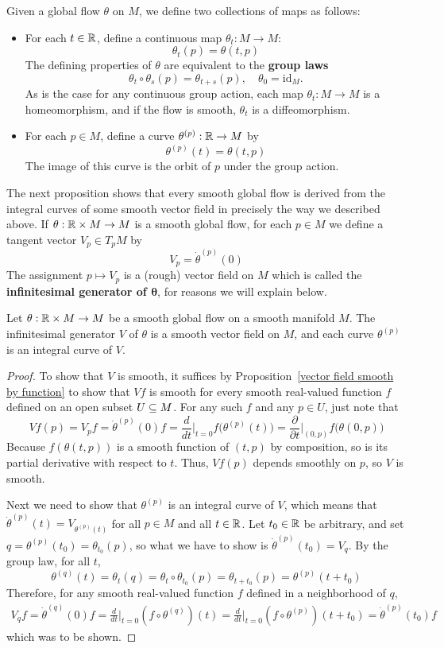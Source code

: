 Given a global flow $\theta$ on $M$, we define two collections of maps as follows:
\begin{itemize}
\item For each $t\in\mathbb{R}$, define a continuous map $\theta_t:M\to M$:
\[\theta_t(p)=\theta(t,p)\]
The defining properties of $\theta$ are equivalent to the \textbf{group laws}
\[\theta_t\circ\theta_s(p)=\theta_{t+s}(p),\quad\theta_0=\mathrm{id}_M.\]
As is the case for any continuous group action, each map $\theta_t:M\to M$ is a homeomorphism, and if the flow is smooth, $\theta_t$ is a diffeomorphism.
\item For each $p\in M$, define a curve $\theta^{(p)}:\mathbb{R}\to M$ by
\[\theta^{(p)}(t)=\theta(t,p)\]
The image of this curve is the orbit of $p$ under the group action.
\end{itemize}
The next proposition shows that every smooth global flow is derived from the
integral curves of some smooth vector field in precisely the way we described above. If $\theta:\mathbb{R}\times M\to M$ is a smooth global flow, for each $p\in M$ we define a tangent vector $V_p\in T_pM$ by
\[V_p=\dot{\theta}^{(p)}(0)\]
The assignment $p\mapsto V_p$ is a (rough) vector field on $M$ which is called the \textbf{infinitesimal generator of $\bm{\theta}$}, for reasons we will explain below.
\begin{proposition}\label{flow generate vector}
Let $\theta:\mathbb{R}\times M\to M$ be a smooth global flow on a smooth manifold $M$. The infinitesimal generator $V$ of $\theta$ is a smooth vector field on $M$, and each curve $\theta^{(p)}$ is an integral curve of $V$.
\end{proposition}
\begin{proof}
To show that $V$ is smooth, it suffices by Proposition~\ref{vector field smooth by function} to show that $Vf$ is smooth for every smooth real-valued function $f$ defined on an open subset $U\subseteq M$. For any such $f$ and any $p\in U$, just note that
\[Vf(p)=V_pf=\dot{\theta}^{(p)}(0)f=\frac{d}{dt}\Big|_{t=0}f\big(\theta^{(p)}(t)\big)=\frac{\partial}{\partial t}\Big|_{(0,p)}f\big(\theta(0,p)\big)\]
Because $f(\theta(t,p))$ is a smooth function of $(t,p)$ by composition, so is its partial derivative with respect to $t$. Thus, $Vf(p)$ depends smoothly on $p$, so $V$ is smooth.\par
Next we need to show that $\theta^{(p)}$ is an integral curve of $V$, which means that $\dot{\theta}^{(p)}(t)=V_{\theta^{(p)}(t)}$ for all $p\in M$ and all $t\in\mathbb{R}$. Let $t_0\in\mathbb{R}$ be arbitrary, and set $q=\theta^{(p)}(t_0)=\theta_{t_0}(p)$, so what we have to show is $\dot{\theta}^{(p)}(t_0)=V_q$. By the group law, for all $t$,
\[\theta^{(q)}(t)=\theta_t(q)=\theta_t\circ\theta_{t_0}(p)=\theta_{t+t_0}(p)=\theta^{(p)}(t+t_0)\]
Therefore, for any smooth real-valued function $f$ defined in a neighborhood of $q$,
\begin{align*}
V_qf=\dot{\theta}^{(q)}(0)f=\frac{d}{dt}\Big|_{t=0}(f\circ\theta^{(q)})(t)=\frac{d}{dt}\Big|_{t=0}(f\circ\theta^{(p)})(t+t_0)=\dot{\theta}^{(p)}(t_0)f
\end{align*}
which was to be shown.
\end{proof}
